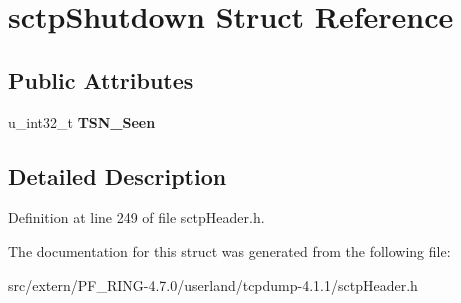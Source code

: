 \hypertarget{structsctp_shutdown}{
\section{sctpShutdown Struct Reference}
\label{structsctp_shutdown}
}
\subsection*{Public Attributes}
\begin{DoxyCompactItemize}
\item 
\hypertarget{structsctp_shutdown_a56a813d3ebdb4b412e8e3adad505e8bb}{
u\_\-int32\_\-t {\bfseries TSN\_\-Seen}}
\label{structsctp_shutdown_a56a813d3ebdb4b412e8e3adad505e8bb}

\end{DoxyCompactItemize}


\subsection{Detailed Description}


Definition at line 249 of file sctpHeader.h.



The documentation for this struct was generated from the following file:\begin{DoxyCompactItemize}
\item 
src/extern/PF\_\-RING-\/4.7.0/userland/tcpdump-\/4.1.1/sctpHeader.h\end{DoxyCompactItemize}
